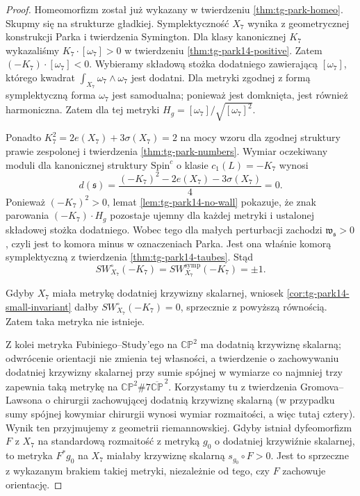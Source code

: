 \begin{proof}
Homeomorfizm został już wykazany w twierdzeniu
\ref{thm:tg-park-homeo}. Skupmy się na strukturze gładkiej.
Symplektyczność $X_7$ wynika z geometrycznej konstrukcji
Parka i twierdzenia Symington. Dla klasy kanonicznej $K_7$
wykazaliśmy $K_7\cdot[\omega_7]>0$ w twierdzeniu
\ref{thm:tg-park14-positive}. Zatem
$(-K_7)\cdot[\omega_7]<0$.
Wybieramy składową stożka dodatniego zawierającą
$[\omega_7]$, którego kwadrat
$\int_{X_7}\omega_7\wedge\omega_7$ jest dodatni.
Dla metryki zgodnej z formą symplektyczną
forma $\omega_7$ jest samodualna; ponieważ
jest domknięta, jest również harmoniczna.
Zatem dla tej metryki
$H_g=[\omega_7]/\sqrt{[\omega_7]^2}$.

Ponadto $K_7^2=2e(X_7)+3\sigma(X_7)=2$
na mocy wzoru dla zgodnej struktury prawie zespolonej
i twierdzenia \ref{thm:tg-park-numbers}.
Wymiar oczekiwany moduli dla kanonicznej struktury
$\mathrm{Spin}^c$ o klasie $c_1(L)=-K_7$ wynosi
\[
d(\mathfrak s)=\frac{(-K_7)^2-2e(X_7)-3\sigma(X_7)}4=0.
\]
Ponieważ $(-K_7)^2>0$, lemat
\ref{lem:tg-park14-no-wall} pokazuje, że znak
parowania $(-K_7)\cdot H_g$ pozostaje ujemny dla
każdej metryki i ustalonej składowej stożka dodatniego.
Wobec tego dla małych perturbacji zachodzi
$\mathfrak w_{\mathfrak s}>0$, czyli jest to komora
minus w oznaczeniach Parka. Jest ona właśnie
komorą symplektyczną z twierdzenia
\ref{thm:tg-park14-taubes}. Stąd
\[
SW_{X_7}^{\circ}(-K_7)
 =SW_{X_7}^{\mathrm{symp}}(-K_7)=\pm1.
\]

Gdyby $X_7$ miała metrykę dodatniej krzywizny skalarnej,
wniosek \ref{cor:tg-park14-small-invariant} dałby
$SW_{X_7}^{\circ}(-K_7)=0$, sprzecznie z powyższą równością.
Zatem taka metryka nie istnieje.

Z kolei metryka Fubiniego--Study'ego na
$\mathbb{CP}^{2}$ ma dodatnią krzywiznę skalarną;
odwrócenie orientacji nie zmienia tej własności,
a twierdzenie o zachowywaniu dodatniej krzywizny
skalarnej przy sumie spójnej w wymiarze co najmniej trzy
zapewnia taką metrykę na
$\mathbb{CP}^{2}\#7\overline{\mathbb{CP}}^{\,2}$.
Korzystamy tu z twierdzenia Gromova--Lawsona
o chirurgii zachowującej dodatnią krzywiznę skalarną
(w przypadku sumy spójnej kowymiar chirurgii wynosi
wymiar rozmaitości, a więc tutaj cztery).
Wynik ten przyjmujemy z geometrii riemannowskiej.
Gdyby istniał dyfeomorfizm $F$ z $X_7$ na standardową
rozmaitość z metryką $g_0$ o dodatniej krzywiźnie
skalarnej, to metryka $F^*g_0$ na $X_7$
miałaby krzywiznę skalarną $s_{g_0}\circ F>0$.
Jest to sprzeczne z wykazanym brakiem takiej metryki,
niezależnie od tego, czy $F$ zachowuje orientację.
\end{proof}

